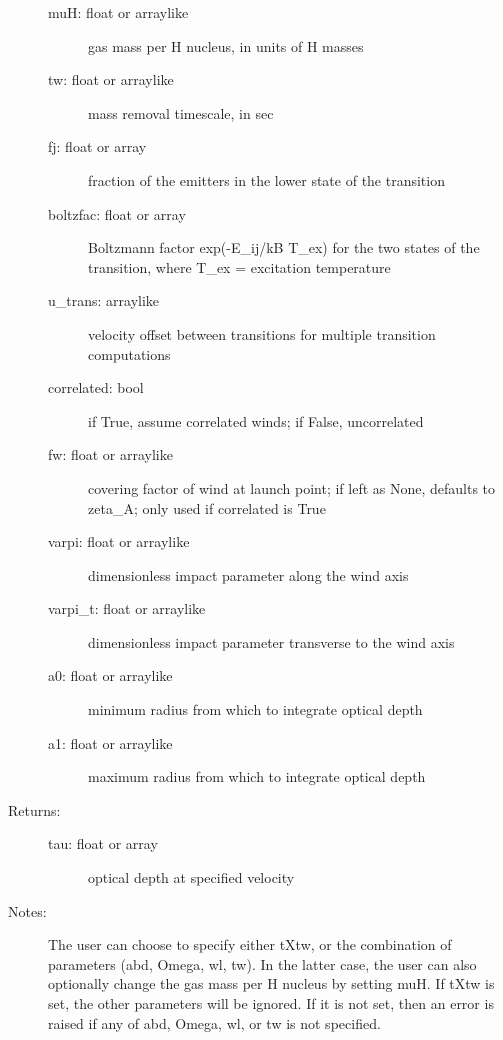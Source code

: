 \documentclass[letterpaper,10pt,english]{sphinxmanual}
\begin{document}
\begin{fulllineitems}
\begin{fulllineitems}
\begin{description}
\begin{description}
\item[{muH: float or arraylike}] \leavevmode
gas mass per H nucleus, in units of H masses

\item[{tw: float or arraylike}] \leavevmode
mass removal timescale, in sec

\item[{fj: float or array}] \leavevmode
fraction of the emitters in the lower state of the
transition

\item[{boltzfac: float or array}] \leavevmode
Boltzmann factor exp(-E\_ij/kB T\_ex) for the two states of
the transition, where T\_ex = excitation temperature

\item[{u\_trans: arraylike}] \leavevmode
velocity offset between transitions for multiple
transition computations

\item[{correlated: bool}] \leavevmode
if True, assume correlated winds; if False, uncorrelated

\item[{fw: float or arraylike}] \leavevmode
covering factor of wind at launch point; if left as
None, defaults to zeta\_A; only used if correlated is True

\item[{varpi: float or arraylike}] \leavevmode
dimensionless impact parameter along the wind axis

\item[{varpi\_t: float or arraylike}] \leavevmode
dimensionless impact parameter transverse to the wind axis

\item[{a0: float or arraylike}] \leavevmode
minimum radius from which to integrate optical depth

\item[{a1: float or arraylike}] \leavevmode
maximum radius from which to integrate optical depth

\end{description}

\item[{Returns:}] \leavevmode\begin{description}
\item[{tau: float or array}] \leavevmode
optical depth at specified velocity

\end{description}

\item[{Notes:}] \leavevmode
The user can choose to specify either tXtw, or the
combination of parameters (abd, Omega, wl, tw). In the
latter case, the user can also optionally change the gas
mass per H nucleus by setting muH. If tXtw is set, the
other parameters will be ignored. If it is not set, then an
error is raised if any of abd, Omega, wl, or tw is not
specified.


\end{description}
\end{fulllineitems}
\end{fulllineitems}
\end{document}
